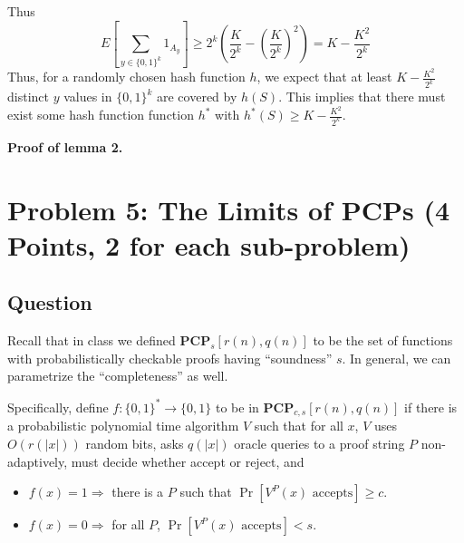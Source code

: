 \documentclass{article}
\newcommand{\mf}[1]{\mathbf{#1}}
\begin{document}
Thus 
$$
E[\sum_{y \in \{0, 1\}^k}1_{A_y}] \geq 2^k(\frac{K}{2^k} - (\frac{K}{2^k})^2) = K - \frac{K^2}{2^k}
$$
Thus, for a randomly chosen hash function $h$, we expect that at least $K - \frac{K^2}{2^k}$ distinct $y$ values in $\{0, 1\}^k$ are covered by $h(S)$.
This implies that there must exist some hash function function $h^*$ with $h^*(S) \geq K - \frac{K^2}{2^k}$.

\medskip
\noindent
\textbf{Proof of lemma 2.}









\newpage
\section*{Problem 5: The Limits of PCPs (4 Points, 2 for each sub-problem)}
\subsection*{Question}
Recall that in class we defined $\mf{PCP}_s[r(n),q(n)]$ to be the set of functions with probabilistically checkable proofs having ``soundness'' $s$. In general, we can parametrize the ``completeness'' as well. 

Specifically, define $f:\{0,1\}^* \rightarrow \{0,1\}$ to be in $\mf{PCP}_{c,s}[r(n),q(n)]$ if there is a probabilistic polynomial time algorithm $V$ such that for all $x$, $V$ uses $O(r(|x|))$ random bits, asks $q(|x|)$ oracle queries to a proof string $P$ non-adaptively, must decide whether accept or reject, and
\begin{itemize}
	\item
	$f(x) = 1 \Longrightarrow$ there is a $P$ such that $\Pr[V^P(x) \textrm{ accepts}] \geq c$.
	\item
	$f(x) = 0 \Longrightarrow$ for all $P$, $\Pr[V^P(x) \textrm{ accepts}] < s$.
\end{itemize}
\end{document}
